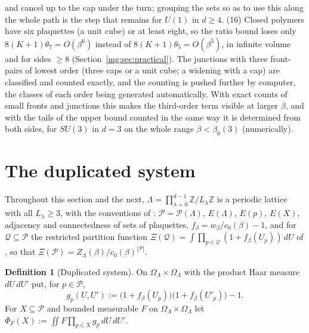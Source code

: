 \documentclass[11pt,a4paper]{article}
\theoremstyle{definition}
\newtheorem{definition}[theorem]{Definition}
\theoremstyle{remark}
\newcommand{\Z}{\mathbb{Z}}
\newcommand{\cP}{\mathcal{P}}
\newcommand{\dU}{\,dU}
\newcommand{\IIIref}[3]{\cite[#1~`#2' (\texttt{#3})]{III}}
\begin{document}
and cancel up to the cap under the turn; grouping the sets so as to use this along the whole path is the step that remains for $U(1)$ in $d\ge4$. (16) Closed polymers have six plaquettes (a unit cube) or at least eight, so the ratio bound loses only $8(K+1)\theta_7=O(\beta^6)$ instead of
$8(K+1)\theta_5=O(\beta^5)$, in infinite volume and for sides $\ge8$ (Section~\ref{mg:sec:practical}). The junctions with three front-pairs of lowest order (three caps or a unit cube; a widening with a cap) are
classified and counted exactly, and the counting is pushed further by computer, the classes of each order being generated automatically. With exact counts of small fronts and
junctions this makes the third-order term visible at larger $\beta$, and with the tails of the upper bound counted in the same way it is determined from both sides, for
$SU(3)$ in $d=3$ on the whole range $\beta<\beta_0(3)$ (numerically).

\section{The duplicated system}\label{mg:sec:dup}

Throughout this section and the next, $\Lambda=\prod_{\lambda=0}^{d-1}\Z/L_\lambda\Z$ is a periodic lattice with all
$L_\lambda\ge3$, with the conventions of \cite{F,III}: $\cP=\cP(\Lambda)$, $E(\Lambda)$, $E(p)$, $E(X)$, adjacency and
connectedness of sets of plaquettes, $f_\beta=w_\beta/c_0(\beta)-1$, and for $\mathcal Q\subseteq\cP$ the restricted
partition function $\Xi(\mathcal Q)=\int\prod_{p\in\mathcal Q}(1+f_\beta(U_p))\dU$ of \IIIref{Definition}{Restricted partition
functions, loop polymers}{al:def:Xi}, so that $\Xi(\cP)=Z_\Lambda(\beta)/c_0(\beta)^{|\cP|}$.

\begin{definition}[Duplicated system]\label{mg:def:dup}
On $\Omega_\Lambda\times\Omega_\Lambda$ with the product Haar measure $dU\,dU'$ put, for $p\in\cP$,
\[
g_p(U,U'):=\bigl(1+f_\beta(U_p)\bigr)\bigl(1+f_\beta(U'_p)\bigr)-1 .
\]
For $X\subseteq\cP$ and bounded measurable $F$ on $\Omega_\Lambda\times\Omega_\Lambda$ let
$\Phi_F(X):=\iint F\prod_{p\in X}g_p\,dU\,dU'$.
\end{definition}
\end{document}
